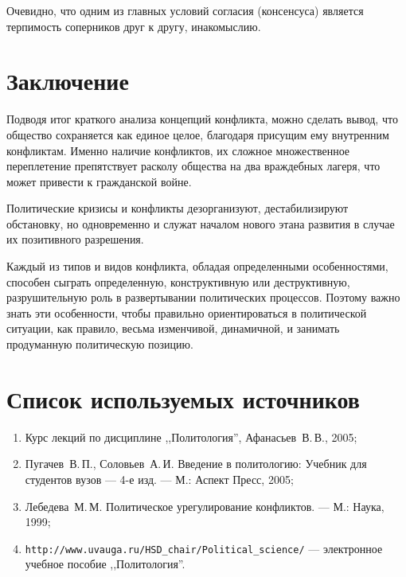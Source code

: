 \documentclass[a4paper,12pt,notitlepage,pdftex,headsepline]{scrartcl}
\begin{document}
  Очевидно, что одним из главных условий согласия (консенсуса) является
  терпимость соперников друг к другу, инакомыслию.

  \clearpage
\section{Заключение}
  Подводя итог краткого анализа концепций конфликта, можно сделать вывод, что
  общество сохраняется как единое целое, благодаря присущим ему внутренним
  конфликтам.
  Именно наличие конфликтов, их сложное множественное переплетение
  препятствует расколу общества на два враждебных лагеря, что может привести к
  гражданской войне.

  Политические кризисы и конфликты дезорганизуют, дестабилизируют обстановку,
  но одновременно и служат началом нового этана развития в случае их
  позитивного разрешения.

  Каждый из типов и видов конфликта, обладая определенными особенностями,
  способен сыграть определенную, конструктивную или деструктивную,
  разрушительную роль в развертывании политических процессов.
  Поэтому важно знать эти особенности, чтобы правильно ориентироваться в
  политической ситуации, как правило, весьма изменчивой, динамичной, и
  занимать продуманную политическую позицию.

  \clearpage
\section{Список используемых источников}
  \begin{enumerate}
    \item Курс лекций по дисциплине ,,Политология'', Афанасьев~В.\,В., 2005;
    \item Пугачев~В.\,П., Соловьев~А.\,И. Введение в политологию: Учебник для
      студентов вузов --- 4-е изд. --- М.: Аспект Пресс, 2005;
    \item Лебедева~М.\,М. Политическое урегулирование конфликтов. --- М.:
      Наука, 1999;
    \item \texttt{http://www.uvauga.ru/HSD\_chair/Political\_science/} ---
      электронное учебное пособие ,,Политология''.
  \end{enumerate}
\end{document}
